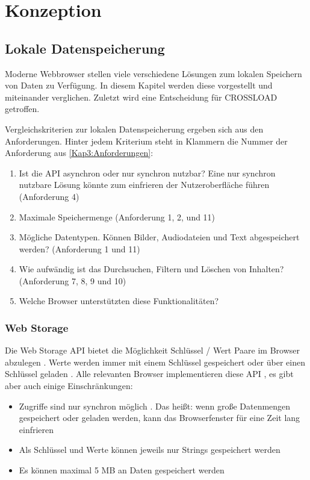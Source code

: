 \chapter{Konzeption}
\label{Kap4}

\section{Lokale Datenspeicherung}
Moderne Webbrowser stellen viele verschiedene Lösungen zum lokalen Speichern von Daten zu Verfügung. In diesem Kapitel werden diese vorgestellt und miteinander verglichen. Zuletzt wird eine Entscheidung für CROSSLOAD getroffen.

Vergleichskriterien zur lokalen Datenspeicherung ergeben sich aus den Anforderungen. Hinter jedem Kriterium steht in Klammern die Nummer der Anforderung aus \autoref{Kap3:Anforderungen}:
\begin{enumerate}
	\item Ist die \ac{API} asynchron oder nur synchron nutzbar? Eine nur synchron nutzbare Lösung könnte zum einfrieren der Nutzeroberfläche führen (Anforderung 4)
	\item Maximale Speichermenge (Anforderung 1, 2, und 11)
	\item Mögliche Datentypen. Können Bilder, Audiodateien und Text abgespeichert werden? (Anforderung 1 und 11)
	\item Wie aufwändig ist das Durchsuchen, Filtern und Löschen von Inhalten? (Anforderung 7, 8, 9 und 10)
	\item Welche Browser unterstützten diese Funktionalitäten?
\end{enumerate}

\subsection{Web Storage}
Die Web Storage \ac{API} bietet die Möglichkeit Schlüssel / Wert Paare im Browser abzulegen \autocite{mdn-web-storage}. Werte werden immer mit einem Schlüssel gespeichert oder über einen Schlüssel geladen \autocite{mdn-web-storage}. Alle relevanten Browser implementieren diese \ac{API} \autocite{mdn-web-storage}, es gibt aber auch einige Einschränkungen:

\begin{itemize}
	\item Zugriffe sind nur synchron möglich \autocite{Hajian2019}. Das heißt: wenn große Datenmengen gespeichert oder geladen werden, kann das Browserfenster für eine Zeit lang einfrieren
	\item Als Schlüssel und Werte können jeweils nur Strings gespeichert werden \autocite{Hajian2019}
	\item Es können maximal 5 \ac{MB} an Daten gespeichert werden \autocite{mdn-web-storage}
\end{itemize}


